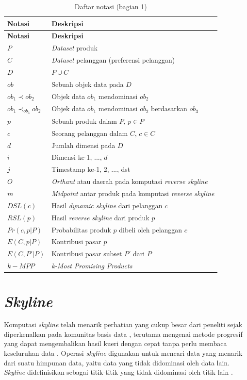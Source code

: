 \begin{longtable}{| p{3cm} | p{6cm} |} 
	\caption{Daftar notasi (bagian 1) \label{tab:daftar-notasi-1}}\\
	\hline
	\textbf{Notasi} & \textbf{Deskripsi}\\ \hline
	\endfirsthead
	\hline
	\textbf{Notasi} & \textbf{Deskripsi}\\ \hline
	\endhead
	$P$ & \textit{Dataset} produk\\ \hline
	$C$ & \textit{Dataset} pelanggan (preferensi pelanggan)\\ \hline
	$D$ & $P \cup C$ \\ \hline
	$ob$ & Sebuah objek data pada $D$\\ \hline
	$ob_1 \prec ob_2$ & Objek data $ob_1$ mendominasi $ob_2$\\ \hline
	$ob_1 \prec_{ob_3} ob_2$ & Objek data $ob_1$ mendominasi $ob_2$ berdasarkan $ob_3$\\ \hline
	$p$ & Sebuah produk dalam $P$, $p \in P$\\ \hline
	$c$ & Seorang pelanggan dalam $C$, $c \in C$\\ \hline
	$d$ & Jumlah dimensi pada $D$\\ \hline
	$i$ & Dimensi ke-1, ..., $d$\\ \hline
	$j$ & Timestamp ke-1, 2, ..., dst\\ \hline
	$O$ & \textit{Orthant} atau daerah pada komputasi \textit{reverse skyline}\\ \hline
	$m$ & \textit{Midpoint} antar produk pada komputasi \textit{reverse skyline}\\ \hline
	$DSL(c)$ & Hasil \textit{dynamic skyline} dari pelanggan $c$\\ \hline
	$RSL(p)$ & Hasil \textit{reverse skyline} dari produk $p$\\ \hline
	$Pr(c, p|P)$ & Probabilitas produk $p$ dibeli oleh pelanggan $c$ \\ \hline
	$E(C, p|P)$ & Kontribusi pasar $p$\\ \hline
	$E(C, P'|P)$ & Kontribusi pasar subset $P'$ dari $P$ \\ \hline
	$k-MPP$ & \textit{k-Most Promising Products} \\ \hline
\end{longtable}

\section{\textit{Skyline}}
\tab Komputasi \textit{skyline} telah menarik perhatian yang cukup besar dari peneliti sejak diperkenalkan pada komunitas basis data \cite{skyline}, terutama mengenai metode progresif yang dapat mengembalikan hasil kueri dengan cepat tanpa perlu membaca keseluruhan data \cite{dynamic-skyline}. Operasi \textit{skyline} digunakan untuk mencari data yang menarik dari suatu himpunan data, yaitu data yang tidak didominasi oleh data lain. \textit{Skyline} didefinisikan sebagai titik-titik yang tidak didominasi oleh titik lain \cite{skyline}.

